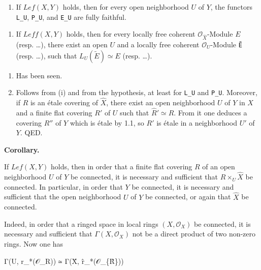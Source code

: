 \documentclass[
  11pt,
  a4paper,
]{book}
\newenvironment{Shaded}{}{}
\newcommand{\NormalTok}[1]{#1}
\providecommand{\tightlist}{%
  \setlength{\itemsep}{0pt}\setlength{\parskip}{0pt}}
\begin{document}
\begin{enumerate}
\def\labelenumi{\arabic{enumi}.}
\tightlist
\item
  If \(Lef(X, Y)\) holds, then for every open neighborhood \(U\) of
  \(Y\), the functors \texttt{L\_U}, \texttt{P\_U}, and \texttt{E\_U}
  are fully faithful.
\end{enumerate}

\begin{enumerate}
\def\labelenumi{\arabic{enumi}.}
\tightlist
\item
  If \(Leff(X, Y)\) holds, then for every locally free coherent
  \(\mathcal{O}_{\hat{X}}\)-Module \(E\) (resp. \ldots), there exist an
  open \(U\) and a locally free coherent \(\mathcal{O}_{U}\)-Module
  \texttt{Ẽ} (resp. \ldots), such that \(L_{U}(\tilde{E})
  \simeq E\) (resp. \ldots).
\end{enumerate}

\begin{enumerate}
\def\labelenumi{(\roman{enumi})}
\item
  Has been seen.
\item
  Follows from (i) and from the hypothesis, at least for \texttt{L\_U}
  and \texttt{P\_U}. Moreover, if \(R\) is an étale covering of
  \(\hat{X}\), there exist an open neighborhood \(U\) of \(Y\) in \(X\)
  and a finite flat covering \(R'\) of \(U\) such that \(\hat{R}'
  \simeq R\). From it one deduces a covering \(R''\) of \(Y\) which is
  étale by 1.1, so \(R'\) is étale in a neighborhood \(U'\) of \(Y\).
  QED.
\end{enumerate}

\textbf{Corollary.}

If \(Lef(X, Y)\) holds, then in order that a finite flat covering \(R\)
of an open neighborhood \(U\) of \(Y\) be connected, it is necessary and
sufficient that \(R \times_{U} \hat{X}\) be connected. In particular, in
order that \(Y\) be connected, it is necessary and sufficient that the
open neighborhood \(U\) of \(Y\) be connected, or again that \(\hat{X}\)
be connected.

Indeed, in order that a ringed space in local rings
\((X, \mathcal{O}_{X})\) be connected, it is necessary and sufficient
that \(\Gamma(X, \mathcal{O}_{X})\) not be a direct product of two
non-zero rings. Now one has

\begin{Shaded}
\begin{Highlighting}[]
\NormalTok{Γ(U, r\_*(𝒪\_R)) ≃ Γ(X̂, r̂\_*(𝒪\_\{R̂\}))}
\end{Highlighting}
\end{Shaded}
\end{document}
